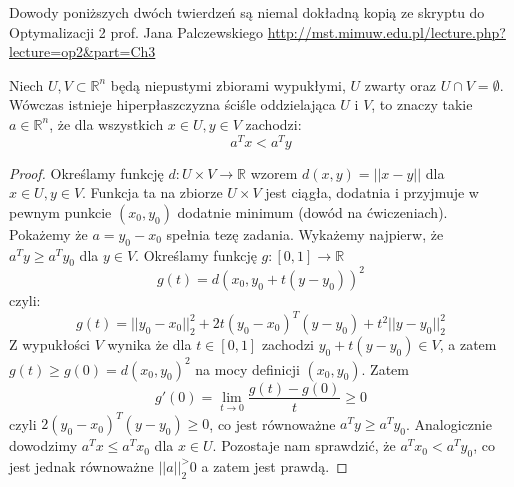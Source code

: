 \documentclass[10pt,a4paper,draft]{report}
\begin{document}
Dowody poniższych dwóch twierdzeń są niemal dokładną kopią ze skryptu do Optymalizacji 2 prof. Jana Palczewskiego \url{http://mst.mimuw.edu.pl/lecture.php?lecture=op2&part=Ch3}

\begin{theorem}
Niech $U,V \subset \mathbb{R}^n$ będą niepustymi zbiorami wypukłymi, $U$ zwarty oraz $U \cap V = \emptyset$. Wówczas istnieje hiperpłaszczyzna ściśle oddzielająca $U$ i $V$, to znaczy takie $a \in \mathbb{R}^n$, że dla wszystkich $x \in U, y \in V$ zachodzi:
\[
a^T x < a^T y
\]
\end{theorem}
\begin{proof}
Określamy funkcję $d: U \times V \rightarrow \mathbb{R}$ wzorem $d(x,y) = ||x-y||$ dla $x \in U, y \in V$. Funkcja ta na zbiorze $U \times V$ jest ciągła, dodatnia i przyjmuje w pewnym punkcie $(x_0, y_0)$ dodatnie minimum (dowód na ćwiczeniach). Pokażemy że  $a = y_0 - x_0$ spełnia tezę zadania. Wykażemy najpierw, że $a^T y \geq a^T y_0$ dla $y \in V$. Określamy funkcję $g: [0,1] \rightarrow \mathbb{R}$
\[
g(t) = d(x_0, y_0 + t(y-y_0))^2
\]
czyli:
\[
g(t) = ||y_0 - x_0||_2^2 + 2t (y_0 - x_0)^T (y - y_0) + t^2 ||y-y_0||_2^2
\]
Z wypukłości $V$ wynika że dla $t \in [0,1]$ zachodzi $y_0 + t(y - y_0) \in V$, a zatem $g(t) \geq g(0) = d(x_0, y_0)^2$ na mocy definicji $(x_0, y_0)$. Zatem 
\[
g'(0) = \lim_{t \rightarrow 0} \frac{g(t) - g(0)}{t} \geq 0
\]
czyli $2(y_0 - x_0)^T (y - y_0) \geq 0$, co jest równoważne $a^T y \geq a^T y_0$. Analogicznie dowodzimy $a^T x \leq a^T x_0$ dla $x \in U$. Pozostaje nam sprawdzić, że $a^T x_0 < a^T y_0$, co jest jednak równoważne $||a||_2^ > 0$ a zatem jest prawdą.
\end{proof}
\end{document}
